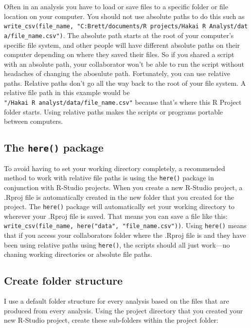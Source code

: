 \documentclass[]{book}
\begin{document}
Often in an analysis you have to load or save files to a specific folder
or file location on your computer. You should not use absolute paths to
do this such as
\texttt{write\_csv(file\_name,\ "C:Brett/documents/R\ projects/Hakai\ R\ Analyst/data/file\_name.csv")}.
The absolute path starts at the root of your computer's specific file
system, and other people will have different absolute paths on their
computer depending on where they saved their files. So if you shared a
script with an absolute path, your collaborator won't be able to run the
script without headaches of changing the abosulute path. Fortunately,
you can use relative paths. Relative paths don't go all the way back to
the root of your file system. A relative file path in this example would
be \texttt{"/Hakai\ R\ analyst/data/file\_name.csv"} because that's
where this R Project folder starts. Using relative paths makes the
scripts or programs portable between computers.

\subsection{\texorpdfstring{The \texttt{here()}
package}{The here() package}}\label{the-here-package}

To avoid having to set your working directory completely, a recommended
method to work with relative file paths is using the \texttt{here()}
package in conjunction with R-Studio projects. When you create a new
R-Studio project, a .Rproj file is automatically created in the new
folder that you created for the project. The \texttt{here()} package
will automatically set your working directory to wherever your .Rproj
file is saved. That means you can save a file like this:
\texttt{write\_csv(file\_name,\ here("data",\ "file\_name.csv"))}. Using
\texttt{here()} means that if you access your collaborators folder where
the .Rproj file is and they have been using relative paths using
\texttt{here()}, the scripts should all just work---no chaning working
directories or absolute file paths.

\subsection{Create folder structure}\label{create-folder-structure}

I use a default folder structure for every analysis based on the files
that are produced from every analysis. Using the project directory that
you created your new R-Studio project, create these sub-folders within
the project folder:
\end{document}
